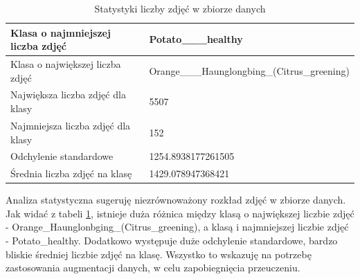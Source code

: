 \begin{table}[H]
	\centering
	\begin{tabular}{|l|l|}
		\hline
		Klasa o najmniejszej liczba zdjęć & Potato\_\_\_healthy                           \\ \hline
		Klasa o największej liczba zdjęć  & Orange\_\_\_Haunglongbing\_(Citrus\_greening) \\ \hline
		Największa liczba zdjęć dla klasy  & 5507                                          \\ \hline
		Najmniejsza liczba zdjęć dla klasy & 152                                           \\ \hline
		Odchylenie standardowe            & 1254.8938177261505                            \\ \hline
		Średnia liczba zdjęć na klasę            & 1429.078947368421                             \\ \hline
	\end{tabular}
\caption{Statystyki liczby zdjęć w zbiorze danych}
\label{tab:dataset_stats}
\end{table}
Analiza statystyczna sugeruję niezrównoważony rozkład zdjęć w zbiorze danych. Jak widać z tabeli \ref{tab:dataset_stats}, istnieje duża różnica  między klasą o największej liczbie zdjęć - Orange\_Haunglonbging\_(Citrus\_greening), a klasą i najmniejszej liczbie zdjęć - Potato\_healthy. Dodatkowo występuje duże odchylenie standardowe, bardzo bliskie średniej liczbie zdjęć na klasę. Wszystko to wskazuję na potrzebę zastosowania augmentacji danych, w celu zapobiegnięcia przeuczeniu.

 


\clearpage
